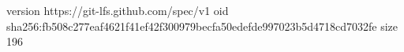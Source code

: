 version https://git-lfs.github.com/spec/v1
oid sha256:fb508c277eaf4621f41ef42f300979becfa50edefde997023b5d4718cd7032fe
size 196
